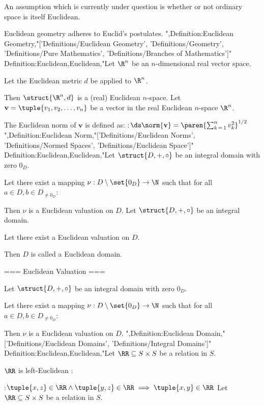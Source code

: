 An assumption which is currently under question is whether or not ordinary space is itself Euclidean.


Euclidean geometry adheres to Euclid's postulates.
",Definition:Euclidean Geometry,"['Definitions/Euclidean Geometry', 'Definitions/Geometry', 'Definitions/Pure Mathematics', 'Definitions/Branches of Mathematics']"
Definition:Euclidean,Euclidean,"Let $\R^n$ be an $n$-dimensional real vector space.

Let the Euclidean metric $d$ be applied to $\R^n$.

Then $\struct {\R^n, d}$ is a (real) Euclidean $n$-space.
Let $\mathbf v = \tuple {v_1, v_2, \ldots, v_n}$ be a vector in the real Euclidean $n$-space $\R^n$.


The Euclidean norm of $\mathbf v$ is defined as:
:$\ds \norm {\mathbf v} = \paren {\sum_{k \mathop = 1}^n v_k^2}^{1/2}$
",Definition:Euclidean Norm,"['Definitions/Euclidean Norms', 'Definitions/Normed Spaces', 'Definitions/Euclidean Space']"
Definition:Euclidean,Euclidean,"Let $\struct {D, +, \circ}$ be an integral domain with zero $0_D$.

Let there exist a mapping $\nu: D \setminus \set {0_D} \to \N$ such that for all $a \in D, b \in D_{\ne 0_D}$:






Then $\nu$ is a Euclidean valuation on $D$.
Let $\struct {D, +, \circ}$ be an integral domain.

Let there exist a Euclidean valuation on $D$.

Then $D$ is called a Euclidean domain.


=== Euclidean Valuation ===

Let $\struct {D, +, \circ}$ be an integral domain with zero $0_D$.

Let there exist a mapping $\nu: D \setminus \set {0_D} \to \N$ such that for all $a \in D, b \in D_{\ne 0_D}$:






Then $\nu$ is a Euclidean valuation on $D$.
",Definition:Euclidean Domain,"['Definitions/Euclidean Domains', 'Definitions/Integral Domains']"
Definition:Euclidean,Euclidean,"Let $\RR \subseteq S \times S$ be a relation in $S$.


$\RR$ is left-Euclidean :

:$\tuple {x, z} \in \RR \land \tuple {y, z} \in \RR \implies \tuple {x, y} \in \RR$
Let $\RR \subseteq S \times S$ be a relation in $S$.


